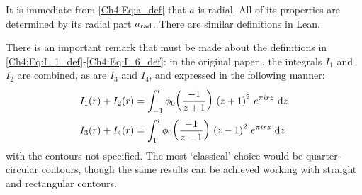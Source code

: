 It is immediate from \eqref{Ch4:Eq:a_def} that $a$ is radial. All of its properties are determined by its radial part $a_{\operatorname{rad}}$. There are similar definitions in Lean.

There is an important remark that must be made about the definitions in \eqref{Ch4:Eq:I_1_def}-\eqref{Ch4:Eq:I_6_def}: in the original paper \cite{Viazovska8}, the integrals $I_1$ and $I_2$ are combined, as are $I_3$ and $I_4$, and expressed in the following manner:
\begin{align*}
    I_1(r) + I_2(r) &= \int_{-1}^{i} \phi_0\!\left( \frac{-1}{z+1} \right) \, \left( z + 1 \right)^2 \, e^{\pi i r z} \, \operatorname{d}\!{z} \\
    I_3(r) + I_4(r) &= \int_{1}^{i} \phi_0\!\left( \frac{-1}{z - 1} \right) \, \left( z - 1 \right)^2 \, e^{\pi i r z} \, \operatorname{d}\!{z}
\end{align*}
with the contours not specified. The most `classical' choice would be quarter-circular contours, though the same results can be achieved working with straight and rectangular contours.

